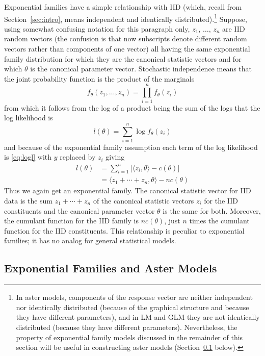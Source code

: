 \documentclass[11pt]{article}
\newcommand{\inner}[1]{\langle #1 \rangle}
\begin{document}
Exponential families have a simple relationship with IID (which, recall from
Section~\ref{sec:intro},
means independent and identically distributed).\footnote{In aster models,
components of the response vector are neither independent nor identically
distributed (because of the graphical structure and because they have
different parameters), and in LM and GLM they are not identically distributed
(because they have different parameters).
Nevertheless, the property of exponential family models discussed in the
remainder of this section will be useful in constructing aster models
(Section~\ref{sec:expo} below).}
Suppose, using somewhat confusing notation for this paragraph only,
$z_1$, $\ldots$, $z_n$ are IID random vectors
(the confusion is that now subscripts denote different random vectors
rather than components of one vector)
all having the same exponential family distribution for which they are
the canonical statistic vectors and for which $\theta$ is
the canonical parameter vector.
Stochastic independence means
that the joint probability function is the product of the marginals
$$
   f_\theta(z_1, \ldots, z_n) = \prod_{i = 1}^n f_\theta(z_i)
$$
from which it follows from the log of a product being the sum of the logs
that the log likelihood is
$$
   l(\theta) = \sum_{i = 1}^n \log f_\theta(z_i)
$$
and because of the exponential family assumption each term of the log
likelihood is \eqref{eq:logl} with $y$ replaced by $z_i$ giving
\begin{equation} \label{eq:iid-expo}
\begin{split}
   l(\theta)
   & =
   \sum_{i = 1}^n \bigl[ \inner{z_i, \theta} - c(\theta) \bigr]
   \\
   & =
   \inner{z_1 + \cdots + z_n, \theta} - n c(\theta)
\end{split}
\end{equation}
Thus we again get an exponential family.
The canonical statistic vector for IID data is
the sum $z_1 + \cdots + z_n$ of the canonical statistic vectors $z_i$ for the
IID constituents and the canonical parameter vector $\theta$ is the same
for both.  Moreover, the cumulant function for the IID family is $n c(\theta)$,
just $n$ times the cumulant function for the IID constituents.
This relationship
is peculiar to exponential families; it has no analog for general statistical
models.

\subsection{Exponential Families and Aster Models} \label{sec:expo}
\end{document}
